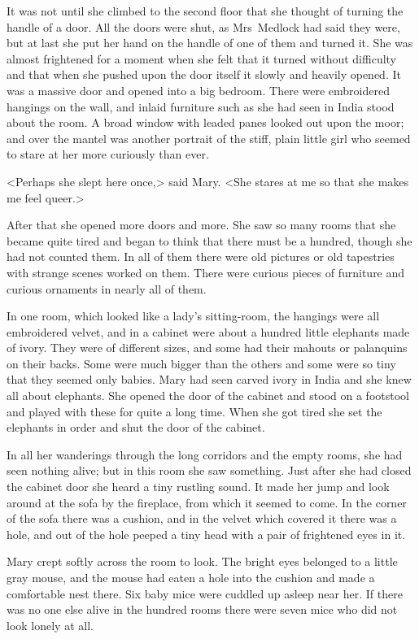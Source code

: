 It was not until she climbed to the second floor that she thought of turning the handle of a door. All the doors were shut, as Mrs~Medlock had said they were, but at last she put her hand on the handle of one of them and turned it. She was almost frightened for a moment when she felt that it turned without difficulty and that when she pushed upon the door itself it slowly and heavily opened. It was a massive door and opened into a big bedroom. There were embroidered hangings on the wall, and inlaid furniture such as she had seen in India stood about the room. A broad window with leaded panes looked out upon the moor; and over the mantel was another portrait of the stiff, plain little girl who seemed to stare at her more curiously than ever.

<Perhaps she slept here once,> said Mary. <She stares at me so that she makes me feel queer.>

After that she opened more doors and more. She saw so many rooms that she became quite tired and began to think that there must be a hundred, though she had not counted them. In all of them there were old pictures or old tapestries with strange scenes worked on them. There were curious pieces of furniture and curious ornaments in nearly all of them.

In one room, which looked like a lady's sitting-room, the hangings were all embroidered velvet, and in a cabinet were about a hundred little elephants made of ivory. They were of different sizes, and some had their mahouts or palanquins on their backs. Some were much bigger than the others and some were so tiny that they seemed only babies. Mary had seen carved ivory in India and she knew all about elephants. She opened the door of the cabinet and stood on a footstool and played with these for quite a long time. When she got tired she set the elephants in order and shut the door of the cabinet.

In all her wanderings through the long corridors and the empty rooms, she had seen nothing alive; but in this room she saw something. Just after she had closed the cabinet door she heard a tiny rustling sound. It made her jump and look around at the sofa by the fireplace, from which it seemed to come. In the corner of the sofa there was a cushion, and in the velvet which covered it there was a hole, and out of the hole peeped a tiny head with a pair of frightened eyes in it.

Mary crept softly across the room to look. The bright eyes belonged to a little gray mouse, and the mouse had eaten a hole into the cushion and made a comfortable nest there. Six baby mice were cuddled up asleep near her. If there was no one else alive in the hundred rooms there were seven mice who did not look lonely at all.

